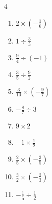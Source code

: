 \begin{multicols}{4}
\begin{enumerate}

\columnbreak %

\resetques

  \item $\displaystyle 2\times{}\left(-\frac{1}{6}\right)$


  \item $\displaystyle 1\div{}\frac{3}{5}$


  \item $\displaystyle \frac{9}{4}\div{}\left(-1\right)$


  \item $\displaystyle \frac{3}{5}\div{}\frac{9}{2}$


  \item $\displaystyle \frac{3}{10}\times{}\left(-\frac{9}{7}\right)$


  \item $\displaystyle -\frac{8}{7}\div{}3$


  \item $\displaystyle 9\times{}2$

        \phantom{$\displaystyle =18$}

  \item $\displaystyle -1\times{}\frac{1}{2}$


  \item $\displaystyle \frac{2}{5}\times{}\left(-\frac{3}{5}\right)$


  \item $\displaystyle \frac{3}{2}\times{}\left(-\frac{2}{3}\right)$

        \phantom{$\displaystyle =-1$}

\columnbreak %

  \item $\displaystyle -\frac{1}{5}\div{}\frac{1}{2}$


\end{enumerate}
\end{multicols}

